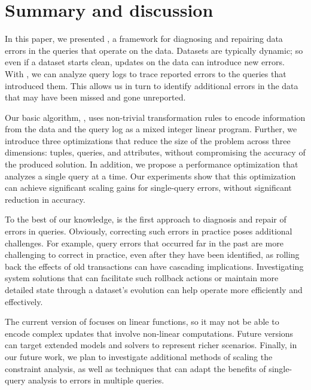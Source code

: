 
\section{Summary and discussion}

In this paper, we presented \sys, a framework for diagnosing and
repairing data errors in the queries that operate on the data.
Datasets are typically dynamic; so even if a dataset starts clean,
updates on the data can introduce new errors. With \sys, we can
analyze query logs to trace reported errors to the queries that
introduced them. This allows us in turn to identify additional errors
in the data that may have been missed and gone unreported.

Our basic algorithm, \naive, uses non-trivial transformation rules to
encode information from the data and the query log as a mixed integer
linear program. Further, we introduce three optimizations that reduce
the size of the problem across three dimensions: tuples, queries, and
attributes, without compromising the accuracy of the produced
solution. In addition, we propose a performance optimization that
analyzes a single query at a time. Our experiments show that this
optimization can achieve significant scaling gains for single-query
errors, without significant reduction in accuracy.

To the best of our knowledge, \sys is the first approach to diagnosis
and repair of errors in queries. Obviously, correcting such errors in
practice poses additional challenges. For example, query errors that
occurred far in the past are more challenging to correct in practice,
even after they have been identified, as rolling back the effects of
old transactions can have cascading implications. Investigating system
solutions that can facilitate such rollback actions or maintain more
detailed state through a dataset's evolution can help \sys operate
more efficiently and effectively.

The current version of \sys focuses on linear functions, so it may not
be able to encode complex updates that involve non-linear
computations. Future versions can target extended models and solvers
to represent richer scenarios. Finally, in our future work, we plan to
investigate additional methods of scaling the constraint analysis, as
well as techniques that can adapt the benefits of single-query
analysis to errors in multiple queries.







